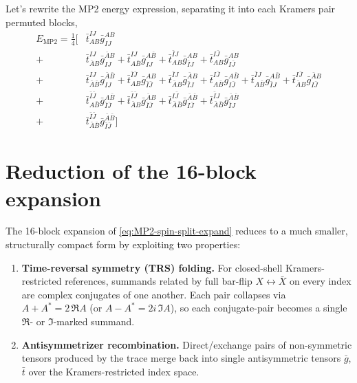 \documentclass[11pt,oneside]{book}
\begin{document}
Let's rewrite the MP2 energy expression, separating it into each Kramers pair permuted blocks,
\begin{align}
    E_{\text{MP2}} 
    = \frac{1}{4} \biggl[ &\bar{t}_{ A B }^{ I J } \bar{g}_{ I J }^{ A B } \\
    + &\bar{t}_{ \bar{A} B }^{ I J } \bar{g}_{ I J }^{ \bar{A} B } 
    + \bar{t}_{ A \bar{B} }^{ I J } \bar{g}_{ I J }^{ A \bar{B} } 
    + \bar{t}_{ A B }^{ \bar{I} J } \bar{g}_{ \bar{I} J }^{ A B }
    + \bar{t}_{ A B }^{ I \bar{J} } \bar{g}_{ I \bar{J} }^{ A B }\\
    + &\bar{t}_{ \bar{A} \bar{B} }^{ I J } \bar{g}_{ I J }^{ \bar{A} \bar{B} }
    + \bar{t}_{ A B }^{ \bar{I} \bar{J} } \bar{g}_{ \bar{I} \bar{J} }^{ A B } 
    + \bar{t}_{ \bar{A} B }^{ \bar{I} J } \bar{g}_{ \bar{I} J }^{ \bar{A} B } 
    + \bar{t}_{ A \bar{B} }^{ I \bar{J} } \bar{g}_{ I \bar{J} }^{ A \bar{B} }
    + \bar{t}_{ A \bar{B} }^{ \bar{I} J } \bar{g}_{ \bar{I} J }^{ A \bar{B} }
    + \bar{t}_{ \bar{A} B }^{ I \bar{J} } \bar{g}_{ I \bar{J} }^{ \bar{A} B } \\
    +& \bar{t}_{ A \bar{B} }^{ \bar{I} \bar{J} } \bar{g}_{ \bar{I} \bar{J} }^{ A \bar{B} } 
    + \bar{t}_{ \bar{A} B }^{ \bar{I} \bar{J} } \bar{g}_{ \bar{I} \bar{J} }^{ \bar{A} B }
    + \bar{t}_{ \bar{A} \bar{B} }^{ I \bar{J} } \bar{g}_{ I \bar{J} }^{ \bar{A} \bar{B} }
    + \bar{t}_{ \bar{A} \bar{B}  }^{ \bar{I} J } \bar{g}_{ \bar{I} J }^{ \bar{A} \bar{B}  } \\
    +& \bar{t}_{ \bar{A} \bar{B} }^{ \bar{I} \bar{J} } \bar{g}_{ \bar{I} \bar{J} }^{ \bar{A} \bar{B} }
    \biggr]
    \label{eq:MP2-spin-split-expand}
\end{align}

\section{Reduction of the 16-block expansion}
\label{sec:KR-MP2-reduction}

The 16-block expansion of \cref{eq:MP2-spin-split-expand} reduces to a
much smaller, structurally compact form by exploiting two properties:

\begin{enumerate}[leftmargin=*]
    \item \textbf{Time-reversal symmetry (TRS) folding.} For closed-shell
    Kramers-restricted references, summands related by full
    bar-flip $X \leftrightarrow \bar{X}$ on every index are complex
    conjugates of one another. Each pair collapses via
    $A + A^{*} = 2\,\Re A$ (or $A - A^{*} = 2i\,\Im A$), so each
    conjugate-pair becomes a single $\Re$- or $\Im$-marked summand.

    \item \textbf{Antisymmetrizer recombination.} Direct/exchange pairs
    of non-symmetric tensors produced by the trace merge back into
    single antisymmetric tensors $\bar{g}$, $\bar{t}$ over the
    Kramers-restricted index space.
\end{enumerate}
\end{document}
